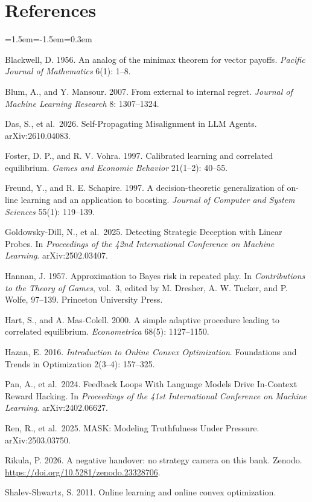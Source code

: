 \documentclass[11pt,a4paper]{article}
\begin{document}
\section*{References}
\begin{list}{}{\leftmargin=1.5em\itemindent=-1.5em\itemsep=0.3em}\small
\item Blackwell, D. 1956. An analog of the minimax theorem for vector payoffs.
\emph{Pacific Journal of Mathematics} 6(1): 1--8.
\item Blum, A., and Y. Mansour. 2007. From external to internal regret.
\emph{Journal of Machine Learning Research} 8: 1307--1324.
\item Das, S., et al.~2026. Self-Propagating Misalignment in LLM Agents.
arXiv:2610.04083.
\item Foster, D. P., and R. V. Vohra. 1997. Calibrated learning and correlated
equilibrium. \emph{Games and Economic Behavior} 21(1--2): 40--55.
\item Freund, Y., and R. E. Schapire. 1997. A decision-theoretic
generalization of on-line learning and an application to boosting.
\emph{Journal of Computer and System Sciences} 55(1): 119--139.
\item Goldowsky-Dill, N., et al.~2025. Detecting Strategic Deception with
Linear Probes. In \emph{Proceedings of the 42nd International Conference
on Machine Learning}. arXiv:2502.03407.
\item Hannan, J. 1957. Approximation to Bayes risk in repeated play. In
\emph{Contributions to the Theory of Games}, vol.~3, edited by M.
Dresher, A. W. Tucker, and P. Wolfe, 97--139. Princeton University
Press.
\item Hart, S., and A. Mas-Colell. 2000. A simple adaptive procedure leading
to correlated equilibrium. \emph{Econometrica} 68(5): 1127--1150.
\item Hazan, E. 2016. \emph{Introduction to Online Convex Optimization}.
Foundations and Trends in Optimization 2(3--4): 157--325.
\item Pan, A., et al.~2024. Feedback Loops With Language Models Drive
In-Context Reward Hacking. In \emph{Proceedings of the 41st
International Conference on Machine Learning}. arXiv:2402.06627.
\item Ren, R., et al.~2025. MASK: Modeling Truthfulness Under Pressure.
arXiv:2503.03750.
\item Rikula, P. 2026. A negative handover: no strategy camera on this bank.
Zenodo. \url{https://doi.org/10.5281/zenodo.23328706}.
\item Shalev-Shwartz, S. 2011. Online learning and online convex optimization.

\end{list}
\end{document}
